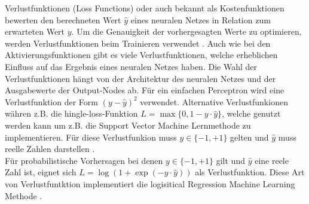 Verlustfunktionen (Loss Functions) oder auch bekannt als Kostenfunktionen bewerten den berechneten Wert $\hat{y}$ eines neuralen 
Netzes in Relation zum erwarteten Wert $y$. Um die Genauigkeit der vorhergesagten Werte zu optimieren,
werden Verlustfunktionen beim Trainieren verwendet \cite{GBCL18}. Auch wie bei den Aktivierungsfunktionen gibt es
viele Verlustfunktionen, welche erheblichen Einfluss auf das Ergebnis eines neuralen Netzes haben. Die Wahl der Verlustfunktionen
hängt von der Architektur des neuralen Netzes und der Ausgabewerte der Output-Nodes ab. Für ein einfachen Perceptron wird eine 
Verlustfunktion der Form $(y - \hat{y})^2$ verwendet. 
Alternative Verlustfunkionen währen z.B. die hingle-loss-Funktion $L = \max\{0,1-y\cdot\hat{y}\}$, welche genutzt werden kann um z.B. die 
Support Vector Machine Lernmethode zu implementieren. Für diese Verlustfunkion muss $y \in \{-1,+1\}$ gelten und $\hat{y}$ muss reelle Zahlen 
darstellen \cite{CA18}.\\
Für probabilistische Vorhersagen bei denen $y \in \{-1,+1\}$ gilt und $\hat{y}$ eine reele Zahl ist,  eignet sich 
$L = \log(1 + \exp(-y \cdot \hat{y}))$ als Verlustfunktion. Diese Art von Verlustfuntktion implementiert die logisitical Regression 
Machine Learning Methode \cite{CA18}.
